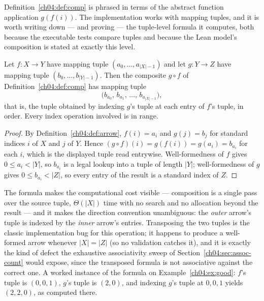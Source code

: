 Definition~\ref{ch04:def:comp} is phrased in terms of the abstract function
application $g(f(i))$. The implementation works with mapping tuples, and it
is worth writing down --- and proving --- the tuple-level formula it
computes, both because the executable tests compare tuples and because the
Lean model's composition is stated at exactly this level.

\begin{proposition}
\label{ch04:prop:tuple}
Let $f : X \to Y$ have mapping tuple $(a_0, \dots, a_{|X|-1})$ and let
$g : Y \to Z$ have mapping tuple $(b_0, \dots, b_{|Y|-1})$. Then the
composite $g \circ f$ of Definition~\ref{ch04:def:comp} has mapping tuple
\[
  \bigl(b_{a_0},\, b_{a_1},\, \dots,\, b_{a_{|X|-1}}\bigr),
\]
that is, the tuple obtained by indexing $g$'s tuple at each entry of $f$'s
tuple, in order. Every index operation involved is in range.
\end{proposition}

\begin{proof}
By Definition~\ref{ch04:def:arrow}, $f(i) = a_i$ and $g(j) = b_j$ for
standard indices $i$ of $X$ and $j$ of $Y$. Hence
$(g \circ f)(i) = g(f(i)) = g(a_i) = b_{a_i}$ for each $i$, which is the
displayed tuple read entrywise. Well-formedness of $f$ gives
$0 \le a_i < |Y|$, so $b_{a_i}$ is a legal lookup into a tuple of length
$|Y|$; well-formedness of $g$ gives $0 \le b_{a_i} < |Z|$, so every entry
of the result is a standard index of $Z$.
\end{proof}

The formula makes the computational cost visible --- composition is a
single pass over the source tuple, $\Theta(|X|)$ time with no search and
no allocation beyond the result --- and it makes the direction convention
unambiguous: the \emph{outer} arrow's tuple is indexed by the \emph{inner}
arrow's entries. Transposing the two tuples is the classic implementation
bug for this operation; it happens to produce a well-formed arrow whenever
$|X| = |Z|$ (so no validation catches it), and it is exactly the kind of
defect the exhaustive associativity sweep of
Section~\ref{ch04:sec:assoc-count} would expose, since the transposed
formula is not associative against the correct one. A worked instance of
the formula on Example~\ref{ch04:ex:good}: $f$'s tuple is $(0, 0, 1)$,
$g$'s tuple is $(2, 0)$, and indexing $g$'s tuple at $0, 0, 1$ yields
$(2, 2, 0)$, as computed there.

